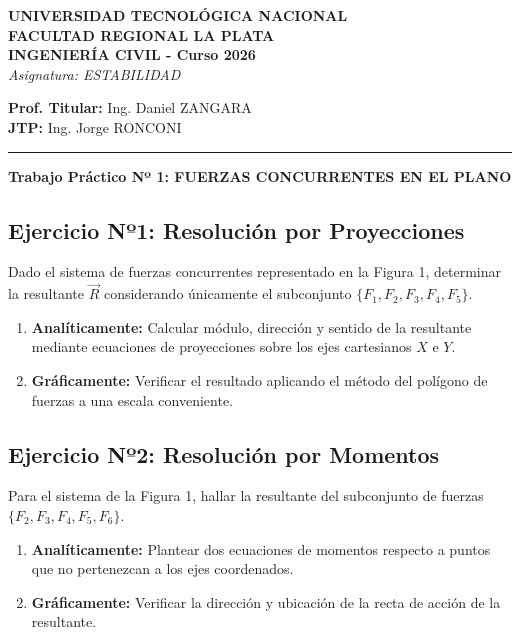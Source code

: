 \documentclass[11pt,a4paper]{article}
\begin{document}
\begin{center}
    \textbf{UNIVERSIDAD TECNOLÓGICA NACIONAL \\ FACULTAD REGIONAL LA PLATA} \\
    \vspace{0.2cm}
    \textbf{INGENIERÍA CIVIL - Curso 2026} \\
    \vspace{0.2cm}
    \textit{Asignatura: ESTABILIDAD}
\end{center}

\vspace{0.3cm}

\begin{flushleft}
    \textbf{Prof. Titular:} Ing. Daniel ZANGARA \\
    \textbf{JTP:} Ing. Jorge RONCONI \\
\end{flushleft}

\noindent\rule{\linewidth}{0.4pt}

\begin{center}
    \vspace{0.4cm}
    \Large \textbf{Trabajo Práctico Nº 1: FUERZAS CONCURRENTES EN EL PLANO} \\
    \vspace{0.4cm}
\end{center}

\subsection*{Ejercicio Nº1: Resolución por Proyecciones}
Dado el sistema de fuerzas concurrentes representado en la Figura 1, determinar la resultante $\vec{R}$ considerando únicamente el subconjunto $\{F_1, F_2, F_3, F_4, F_5\}$.
\begin{enumerate}[label=\alph*)]
    \item \textbf{Analíticamente:} Calcular módulo, dirección y sentido de la resultante mediante ecuaciones de proyecciones sobre los ejes cartesianos $X$ e $Y$.
    \item \textbf{Gráficamente:} Verificar el resultado aplicando el método del polígono de fuerzas a una escala conveniente.
\end{enumerate}


\subsection*{Ejercicio Nº2: Resolución por Momentos}
Para el sistema de la Figura 1, hallar la resultante del subconjunto de fuerzas $\{F_2, F_3, F_4, F_5, F_6\}$.
\begin{enumerate}[label=\alph*)]
    \item \textbf{Analíticamente:} Plantear dos ecuaciones de momentos respecto a puntos que no pertenezcan a los ejes coordenados.
    \item \textbf{Gráficamente:} Verificar la dirección y ubicación de la recta de acción de la resultante.
\end{enumerate}
\end{document}
